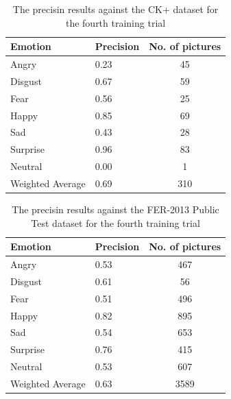 \documentclass[runningheads,a4paper,11pt]{report}
\begin{document}
\begin{table}[htbp]
	\caption{The precisin results against the CK+ dataset for the fourth training trial}
	\label{fer_training_28k_001_mean_square_ckp}
		\begin{center}
			\begin{tabular}{p{110pt}p{110pt}c}
				\textbf{Emotion}& \textbf{Precision}& \textbf{No. of pictures} \\
				\hline\hline
				Angry& 0.23& 45 \\
				Disgust& 0.67& 59 \\
				Fear& 0.56& 25 \\
				Happy& 0.85& 69 \\
				Sad& 0.43& 28 \\
				Surprise& 0.96& 83 \\
				Neutral& 0.00& 1 \\
				\hline
				Weighted Average& 0.69& 310
			\end{tabular}
		\end{center}
\end{table}
\begin{table}[htbp]
	\caption{The precisin results against the FER-2013 Public Test dataset for the fourth training trial}
	\label{fer_training_28k_001_mean_square_public_test}
		\begin{center}
			\begin{tabular}{p{110pt}p{110pt}c}
				\textbf{Emotion}& \textbf{Precision}& \textbf{No. of pictures} \\
				\hline\hline
				Angry& 0.53& 467 \\
				Disgust& 0.61& 56 \\
				Fear& 0.51& 496 \\
				Happy& 0.82& 895 \\
				Sad& 0.54& 653 \\
				Surprise& 0.76& 415 \\
				Neutral& 0.53& 607 \\
				\hline
				Weighted Average& 0.63 &3589
			\end{tabular}
		\end{center}
\end{table}
\end{document}

